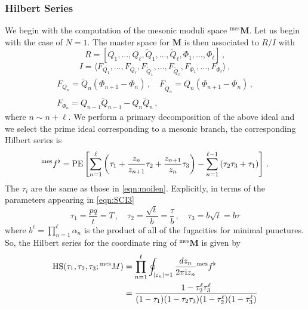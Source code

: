 \documentclass[main.tex]{subfiles}
\begin{document}
\subsubsection{Hilbert Series}
We begin with the computation of the mesonic moduli space ${}^{\text{mes}}\mathbf{M}$. Let us begin with the case of $N=1$. The master space for $\mathbf{M}$ is then associated to $R/I$ with
\begin{equation}
 R=[Q_1,\dots,Q_{\ell},\widetilde{Q}_1,\dots,\widetilde{Q}_{\ell},\Phi_1,\dots,\Phi_{\ell}]\,,
\end{equation}
\begin{equation}
I=\langle F_{Q_1},\dots,F_{Q_{\ell}},F_{\widetilde{Q}_1},\dots,F_{\widetilde{Q}_{\ell}},F_{\Phi_1},\dots,F_{\Phi_{\ell}}\rangle\,,
\end{equation}
\begin{gather}
F_{Q_{n}}=\widetilde{Q}_n(\Phi_{n+1}-\Phi_n)\,,\quad F_{\widetilde{Q}_n}=Q_n(\Phi_{n+1}-\Phi_n)\,,\\ F_{\Phi_n}=Q_{n-1}\widetilde{Q}_{n-1}-Q_n\widetilde{Q}_{n}\,,
\end{gather}
where $n\sim n+\ell$. We perform a primary decomposition of the above ideal and we select the prime ideal corresponding to a mesonic branch, the corresponding Hilbert series is 
\begin{equation}
{}^{\text{mes}}f^{\flat}=\operatorname{\mathrm{PE}}\left[\sum_{n=1}^{\ell}\left(\tau_1+\frac{z_n}{z_{n+1}}\tau_2+\frac{z_{n+1}}{z_{n}}\tau_3\right)-\sum_{n=1}^{\ell-1}\left(\tau_2\tau_3+\tau_1\right)\right]\,.
\end{equation}
The $\tau_i$ are the same as those in \eqref{eqn:moilen}. Explicitly, in terms of the parameters appearing in \eqref{eqn:SCI3}
\begin{equation}
\tau_1=\frac{pq}{t}=T\,,\quad \tau_2=\frac{\sqrt{t}}{b}=\frac{\tau}{b}\,,\quad \tau_3=b\sqrt{t}=b\tau
\end{equation} 
where $b^{\ell}=\prod_{n=1}^{\ell}\alpha_n$ is the product of all of the fugacities for minimal punctures. So, the Hilbert series for the coordinate ring of ${}^{\text{mes}}\mathbf{M}$ is given by
\begin{equation}
\begin{aligned}
\textrm{HS}(\tau_1,\tau_2,\tau_3;{}^{\text{mes}}M)&=\prod_{n=1}^{\ell}\oint_{\mid z_n \mid =1}\frac{dz_n}{2\pi\mathrm{i} z_n}{}^{\text{mes}}f^{\flat}\\
&=\frac{1-\tau_2^{\ell}\tau_3^{\ell}}{(1-\tau_1)(1-\tau_2\tau_3)(1-\tau_2^{\ell})(1-\tau_3^{\ell})}
\end{aligned}
\end{equation}
\end{document}
